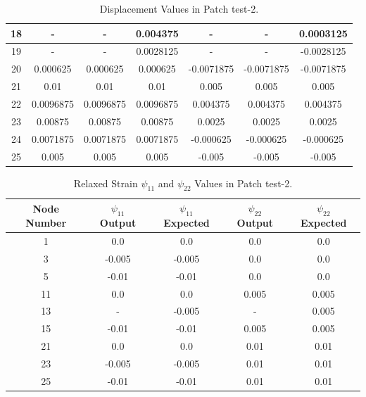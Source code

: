 \documentclass[12pt]{article}
\begin{document}
\begin{table}
\begin{center}
\begin{tabular}{||c c c c c c c||}
			\rowcolor{lightgray} 18 & - & - & 0.004375 & - & - & 0.0003125 \\ 
			[0.8ex]
			\hline
			\rowcolor{lightgray} 19 & - & - & 0.0028125 & - & - & -0.0028125  \\ 
			[0.8ex]
			\hline
			20 & 0.000625 & 0.000625 & 0.000625 & -0.0071875 & -0.0071875 & -0.0071875  \\ 
			[0.8ex]
			\hline
			21 & 0.01 & 0.01 & 0.01 & 0.005 & 0.005 & 0.005  \\ 
			[0.8ex]
			\hline
			22 & 0.0096875 & 0.0096875 & 0.0096875 & 0.004375 & 0.004375 & 0.004375 \\ 
			[0.8ex]
			\hline
			23 & 0.00875 & 0.00875 & 0.00875 & 0.0025 & 0.0025 & 0.0025 \\ 
			[0.8ex]
			\hline
			24 & 0.0071875 & 0.0071875 & 0.0071875 & -0.000625 & -0.000625 & -0.000625 \\ 
			[0.8ex]	
			\hline
			25 & 0.005 & 0.005 & 0.005 & -0.005 & -0.005 & -0.005 \\  [0.8ex] 
			\hline
		\end{tabular}
		\caption{Displacement Values in Patch test-2.}
	\end{center}
\end{table}

\begin{table}
	\begin{center}
		\begin{tabular}{||c c c c c||} 
			\hline
			Node Number & $\psi_{11}$ Output & $\psi_{11}$ Expected  & $\psi_{22}$ Output & $\psi_{22}$ Expected \\ [0.8ex] 
			\hline\hline
			1 & 0.0 & 0.0 & 0.0 & 0.0  \\ 
			[0.8ex]
			\hline
			3 & -0.005 & -0.005 & 0.0 & 0.0  \\ 
			[0.8ex]
			\hline
			5 & -0.01 & -0.01 & 0.0 & 0.0   \\ 
			[0.8ex]
			\hline
			11 & 0.0 & 0.0 & 0.005 & 0.005   \\ 
			[0.8ex]
			\hline
			\rowcolor{lightgray} 13 & - & -0.005 & - & 0.005  \\ 
			[0.8ex]
			\hline
			15 & -0.01 & -0.01 & 0.005 & 0.005  \\ 
			[0.8ex]
			\hline
			21 & 0.0 & 0.0 & 0.01 & 0.01  \\ 
			[0.8ex]
			\hline
			23 & -0.005 & -0.005 & 0.01 & 0.01  \\ 
			[0.8ex]
			\hline	
			25 & -0.01 & -0.01 & 0.01 & 0.01   \\ 
			[0.8ex]
			\hline
		\end{tabular}
		\caption{Relaxed Strain $\psi_{11}$ and $\psi_{22}$ Values in Patch test-2.}
	\end{center}
\end{table}
\end{document}
